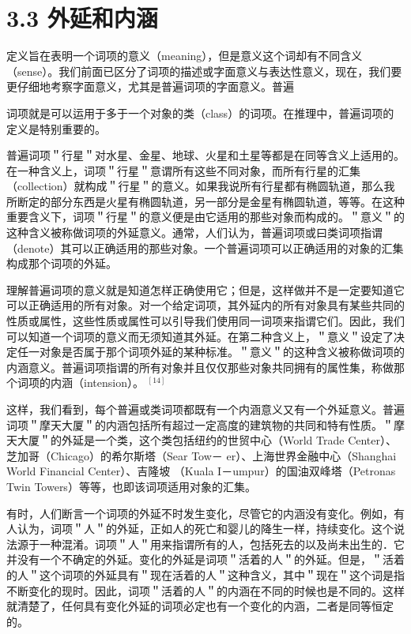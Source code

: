 \section*{3.3 外延和内涵}
定义旨在表明一个词项的意义（meaning），但是意义这个词却有不同含义（sense）。我们前面已区分了词项的描述或字面意义与表达性意义，现在，我们要更仔细地考察字面意义，尤其是普遍词项的字面意义。普遍

词项就是可以运用于多于一个对象的类（class）的词项。在推理中，普遍词项的定义是特别重要的。

普遍词项＂行星＂对水星、金星、地球、火星和土星等都是在同等含义上适用的。在一种含义上，词项＂行星＂意谓所有这些不同对象，而所有行星的汇集（collection）就构成＂行星＂的意义。如果我说所有行星都有椭圆轨道，那么我所断定的部分东西是火星有椭圆轨道，另一部分是金星有椭圆轨道，等等。在这种重要含义下，词项＂行星＂的意义便是由它适用的那些对象而构成的。＂意义＂的这种含义被称做词项的外延意义。通常，人们认为，普遍词项或曰类词项指谓（denote）其可以正确适用的那些对象。一个普遍词项可以正确适用的对象的汇集构成那个词项的外延。

理解普遍词项的意义就是知道怎样正确使用它；但是，这样做并不是一定要知道它可以正确适用的所有对象。对一个给定词项，其外延内的所有对象具有某些共同的性质或属性，这些性质或属性可以引导我们使用同一词项来指谓它们。因此，我们可以知道一个词项的意义而无须知道其外延。在第二种含义上，＂意义＂设定了决定任一对象是否属于那个词项外延的某种标准。＂意义＂的这种含义被称做词项的内涵意义。普遍词项指谓的所有对象并且仅仅那些对象共同拥有的属性集，称做那个词项的内涵（intension）。 ${ }^{[14]}$

这样，我们看到，每个普遍或类词项都既有一个内涵意义又有一个外延意义。普遍词项＂摩天大厦＂的内涵包括所有超过一定高度的建筑物的共同和特有性质。＂摩天大厦＂的外延是一个类，这个类包括纽约的世贸中心（World Trade Center）、芝加哥（Chicago）的希尔斯塔（Sear Tow－ er）、上海世界金融中心（Shanghai World Financial Center）、吉隆坡 （Kuala I－umpur）的国油双峰塔（Petronas Twin Towers）等等，也即该词项适用对象的汇集。

有时，人们断言一个词项的外延不时发生变化，尽管它的内涵没有变化。例如，有人认为，词项＂人＂的外延，正如人的死亡和婴儿的降生一样，持续变化。这个说法源于一种混淆。词项＂人＂用来指谓所有的人，包括死去的以及尚未出生的．它并没有一个不确定的外延。变化的外延是词项＂活着的人＂的外延。但是，＂活着的人＂这个词项的外延具有＂现在活着的人＂这种含义，其中＂现在＂这个词是指不断变化的现时。因此，词项＂活着的人＂的内涵在不同的时候也是不同的。这样就清楚了，任何具有变化外延的词项必定也有一个变化的内涵，二者是同等恒定的。

